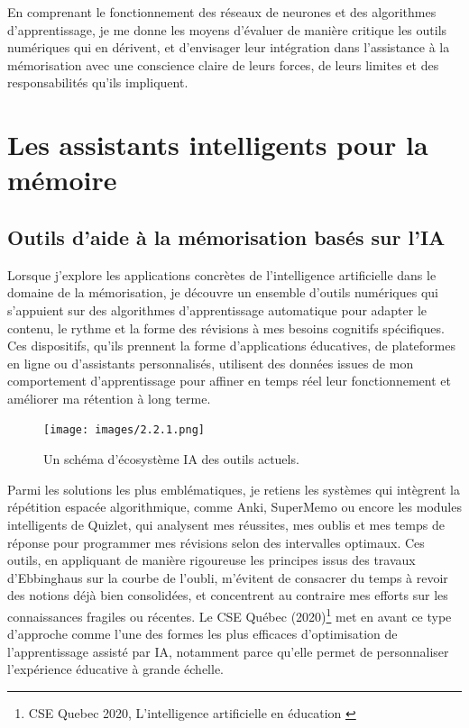 \documentclass[11pt,a4paper]{report}
\begin{document}
En comprenant le fonctionnement des réseaux de neurones et des algorithmes d’apprentissage, je me donne les moyens d’évaluer de manière critique les outils numériques qui en dérivent, et d’envisager leur intégration dans l’assistance à la mémorisation avec une conscience claire de leurs forces, de leurs limites et des responsabilités qu’ils impliquent.

\section{Les assistants intelligents pour la mémoire}

\subsection{Outils d’aide à la mémorisation basés sur l’IA}

Lorsque j’explore les applications concrètes de l’intelligence artificielle dans le domaine de la mémorisation, je découvre un ensemble d’outils numériques qui s’appuient sur des algorithmes d’apprentissage automatique pour adapter le contenu, le rythme et la forme des révisions à mes besoins cognitifs spécifiques. Ces dispositifs, qu’ils prennent la forme d’applications éducatives, de plateformes en ligne ou d’assistants personnalisés, utilisent des données issues de mon comportement d’apprentissage pour affiner en temps réel leur fonctionnement et améliorer ma rétention à long terme.

\begin{figure}[h]
    \centering
    \texttt{[image: images/2.2.1.png]}
    \caption{Un schéma d’écosystème IA des outils actuels.}
    \label{fig:2.2.1}
\end{figure}

Parmi les solutions les plus emblématiques, je retiens les systèmes qui intègrent la répétition espacée algorithmique, comme Anki, SuperMemo ou encore les modules intelligents de Quizlet, qui analysent mes réussites, mes oublis et mes temps de réponse pour programmer mes révisions selon des intervalles optimaux. Ces outils, en appliquant de manière rigoureuse les principes issus des travaux d’Ebbinghaus sur la courbe de l’oubli, m’évitent de consacrer du temps à revoir des notions déjà bien consolidées, et concentrent au contraire mes efforts sur les connaissances fragiles ou récentes. Le CSE Québec (2020)\footnote{CSE Quebec 2020, L’intelligence artificielle en éducation \cite{hypotheses}} met en avant ce type d’approche comme l’une des formes les plus efficaces d’optimisation de l’apprentissage assisté par IA, notamment parce qu’elle permet de personnaliser l’expérience éducative à grande échelle.
\end{document}
